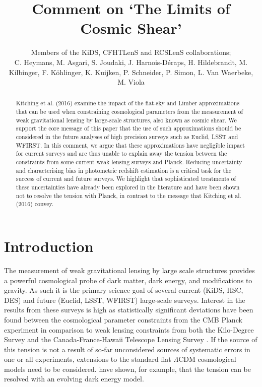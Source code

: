 \documentclass[preprint]{aastex}
\begin{document}
\title{\huge{Comment on `The Limits of Cosmic Shear'}}

\author{Members of the KiDS, CFHTLenS and RCSLenS collaborations; \\
C. Heymans, M. Asgari, S. Joudaki, J. Harnois-D\'eraps, H. Hildebrandt, M. Kilbinger, F. K\"ohlinger, K. Kuijken, P. Schneider, P. Simon, L. Van Waerbeke, M. Viola}%


\begin{abstract}
Kitching et al. (2016) examine the impact of the flat-sky and Limber approximations that can be used when constraining cosmological parameters from the measurement of weak gravitational lensing by large-scale structures, also known as cosmic shear.  We support the core message of this paper that the use of such approximations should be considered in the future analyses of high precision surveys such as Euclid, LSST and WFIRST.  In this comment, we argue that these approximations have negligible impact for current surveys and are thus unable to explain away the tension between the constraints from some current weak lensing surveys and Planck.  Reducing uncertainty and characterising bias in photometric redshift estimation is a critical task for the success of current and future surveys.  We highlight that sophisticated treatments of these uncertainties have already been explored in the literature and have been shown not to resolve the tension with Planck, in contrast to the message that Kitching et al. (2016) convey.

\end{abstract}
\section{Introduction}

The measurement of weak gravitational lensing by large scale structures provides a powerful cosmological probe of dark matter, dark energy, and modifications to gravity.  As such it is the primary science goal of several current (KiDS, HSC, DES) and future (Euclid, LSST, WFIRST) large-scale surveys. Interest in the results from these surveys is high as statistically significant deviations have been found between the cosmological parameter constraints from the CMB Planck experiment \citep{planck/cosmo:2015} in comparison to weak lensing constraints from both the Kilo-Degree Survey \citep[KiDS;][]{hildebrandt/etal:2016} and the Canada-France-Hawaii Telescope Lensing Survey \citep[CFHTLenS;][] {joudaki/etal:2016}.  If the source of this tension is not a result of so-far unconsidered sources of systematic errors in one or all experiments, extensions to the standard flat $\Lambda$CDM cosmological models need to be considered.  \citet{joudaki/etal:2017} have shown, for example, that the tension can be resolved with an evolving dark energy model.
\end{document}
